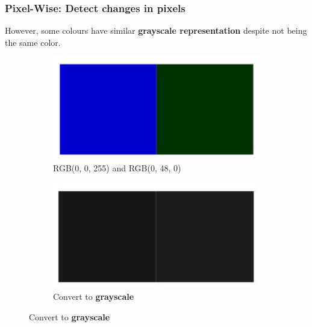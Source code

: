 \documentclass[13.5pt,aspecratio=169, xcolor=dvipsnames]{beamer}
\begin{document}
\begin{frame}
    \onehalfspacing
        \frametitle{Pixel-Wise: Detect changes in pixels}
        
        
        
        However, some colours have similar \textbf{grayscale representation} despite not being the same color. 

        \bigskip

        \begin{figure}
            \begin{subfigure}{0.5\textwidth}
              \centering
              \includegraphics[width=\linewidth]{RGB_color.png}
              \captionsetup{labelformat=empty}
              \caption{RGB(0, 0, 255) and RGB(0, 48, 0)}
            \end{subfigure}%
            \begin{subfigure}{0.5\textwidth}
              \centering
              \includegraphics[width=0.985\linewidth]{RGB_color_grayscale.png}
              \captionsetup{labelformat=empty}
              \caption{Convert to \textbf{grayscale}}
            \end{subfigure}
            \captionsetup{labelformat=empty}
        \end{figure}

        \bigskip

        

      
\end{frame}
    
\end{document}
